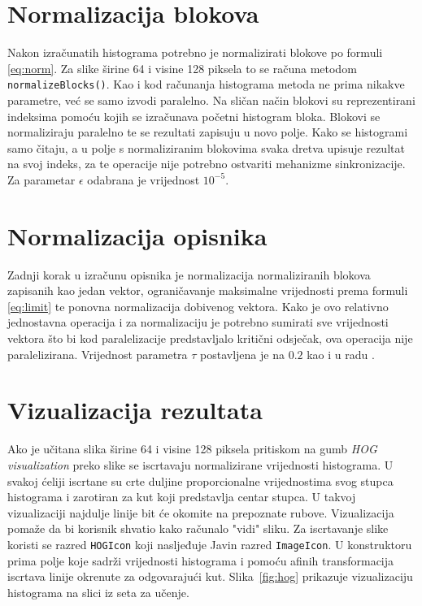 \documentclass[times, utf8, zavrsni]{fer}
\begin{document}
\section{Normalizacija blokova}
Nakon izračunatih histograma potrebno je normalizirati blokove po formuli \ref{eq:norm}. Za slike širine 64 i visine 128 piksela to se računa metodom \verb|normalizeBlocks()|. Kao i kod računanja histograma metoda ne prima nikakve parametre, već se samo izvodi paralelno. Na sličan način blokovi su reprezentirani indeksima pomoću kojih se izračunava početni histogram bloka. Blokovi se normaliziraju paralelno te se rezultati zapisuju u novo polje. Kako se histogrami samo čitaju, a u polje s normaliziranim blokovima svaka dretva upisuje rezultat na svoj indeks, za te operacije nije potrebno ostvariti mehanizme sinkronizacije. Za parametar $\epsilon$ odabrana je vrijednost \(10^{-5}\).

\section{Normalizacija opisnika}
Zadnji korak u izračunu opisnika je normalizacija normaliziranih blokova zapisanih kao jedan vektor, ograničavanje maksimalne vrijednosti prema formuli \ref{eq:limit} te ponovna normalizacija dobivenog vektora. Kako je ovo relativno jednostavna operacija i za normalizaciju je potrebno sumirati sve vrijednosti vektora što bi kod paralelizacije predstavljalo kritični odsječak, ova operacija nije paralelizirana. Vrijednost parametra $\tau$ postavljena je na \(0.2\) kao i u radu \cite{tomasi2012histograms}.

\section{Vizualizacija rezultata}
Ako je učitana slika širine 64 i visine 128 piksela pritiskom na gumb \textit{HOG visualization} preko slike se iscrtavaju normalizirane vrijednosti histograma. U svakoj ćeliji iscrtane su crte duljine proporcionalne vrijednostima svog stupca histograma i zarotiran za kut koji predstavlja centar stupca. U takvoj vizualizaciji najdulje linije bit će okomite na prepoznate rubove. Vizualizacija pomaže da bi korisnik shvatio kako računalo "vidi" sliku. Za iscrtavanje slike koristi se razred \verb|HOGIcon| koji nasljeđuje Javin razred \verb|ImageIcon|. U konstruktoru prima polje koje sadrži vrijednosti histograma i pomoću afinih transformacija iscrtava linije okrenute za odgovarajući kut. Slika~\ref{fig:hog} prikazuje vizualizaciju histograma na slici iz seta za učenje.
\end{document}
